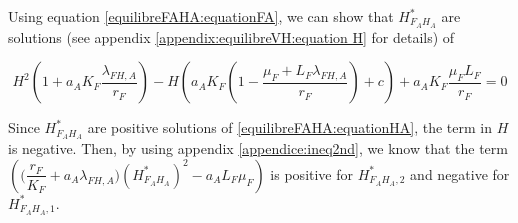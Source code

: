 \documentclass{article}
\newcommand{\lfa}{\lambda_{FH, A}}
\begin{document}
\begin{itemize}
Using equation \eqref{equilibreFAHA:equationFA}, we can show that $H^*_{F_AH_A}$ are solutions (see appendix \ref{appendix:equilibreVH:equation H} for details) of

\begin{equation}
H^2 \left(1 + a_AK_F \dfrac{\lfa}{r_F} \right) - H \left( a_AK_F\left(1 - \dfrac{\mu_F + L_F \lfa}{r_F} \right) + c \right) + a_A K_F\dfrac{\mu_F L_F}{r_F} = 0
\label{equilibreFAHA:equationHA}
\end{equation}

Since $H^*_{F_AH_A}$ are positive solutions of \eqref{equilibreFAHA:equationHA}, the term in $H$ is negative. Then, by using appendix \ref{appendice:ineq2nd}, we know that the term $\left( \Big(\dfrac{r_F}{K_F} + a_A\lfa\Big) (H^*_{F_AH_A})^2 - a_A L_F \mu_F \right)$ is positive for $H^*_{F_AH_A, 2}$ and negative for $H^*_{F_AH_A, 1}$.
\\


\end{itemize}
\end{document}
